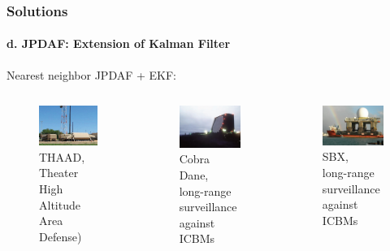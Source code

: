 \documentclass{beamer}
\begin{document}
\begin{frame}
\frametitle{Solutions}
\framesubtitle{d. JPDAF: Extension of Kalman Filter}
\mypagenum
	Nearest neighbor JPDAF + EKF:
	\begin{columns}
		\begin{column}{1.0in}
			\begin{figure}
			{
				\includegraphics[width=1.0in]{figs/TRK_JPDAF_example_THAAD.jpg}
				\caption {THAAD, \\Theater High Altitude Area Defense)}
			}
			\end{figure}
		\end{column}
		\begin{column}{1.0in}
			\begin{figure}
			{
				\includegraphics[width=1.0in]{figs/TRK_JPDAF_example_Cobra.jpg}
				\caption {Cobra Dane,\\long-range surveillance against ICBMs}
			}
			\end{figure}
		\end{column}
		\begin{column}{1.0in}
			\begin{figure}
			{
				\includegraphics[width=1.0in]{figs/TRK_JPDAF_example_SBX.jpg}
				\caption {SBX,\\long-range surveillance against ICBMs}
			}
			\end{figure}
		\end{column}
	\end{columns}
\end{frame}



\end{document}
